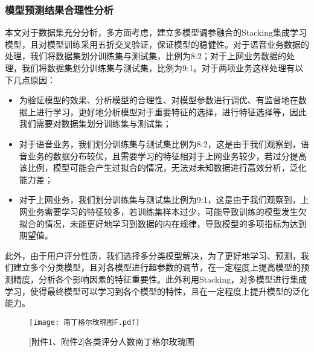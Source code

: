\documentclass{MathorCupmodeling}
\begin{document}
	\subsubsection{模型预测结果合理性分析}
	本文对于数据集充分分析，多方面考虑，建立多模型调参融合的Stacking集成学习模型，且对模型训练采用五折交叉验证，保证模型的稳健性。对于语音业务数据的处理，我们将数据集划分训练集与测试集，比例为8:2；对于上网业务数据的处理，我们将数据集划分训练集与测试集，比例为9:1。对于两项业务这样处理有以下几点原因：
	\begin{itemize}
		\item 为验证模型的效果、分析模型的合理性、对模型参数进行调优、有监督地在数据上进行学习，更好地分析模型对于重要特征的选择，进行特征选择等，因此我们需要对数据集划分训练集与测试集；
		\item 对于语音业务，我们划分训练集与测试集比例为8:2，这是由于我们观察到，语音业务的数据分布较优，且需要学习的特征相对于上网业务较少，若过分提高该比例，模型可能会产生过拟合的情况，无法对未知数据进行高效分析，泛化能力差；
		\item 对于上网业务，我们划分训练集与测试集比例为9:1，这是由于我们观察到，上网业务需要学习的特征较多，若训练集样本过少，可能导致训练的模型发生欠拟合的情况，未能更好地学习到数据的内在规律，导致模型的多项指标为达到期望值。
	\end{itemize}
	
	此外，由于用户评分性质，我们选择多分类模型解决，为了更好地学习、预测，我们建立多个分类模型，且对各模型进行超参数的调节，在一定程度上提高模型的预测精度，分析各个影响因素的特征重要性。此外利用Stacking，对多模型进行集成学习，使得最终模型可以学习到各个模型的特性，且在一定程度上提升模型的泛化能力。
	\begin{figure}[H]
		\centerline{\texttt{[image: 南丁格尔玫瑰图F.pdf]}}
		\caption{[附件1、附件2]各类评分人数南丁格尔玫瑰图}\label{fig:NightingaleRoseDiagramF}
	\end{figure}
\end{document}
